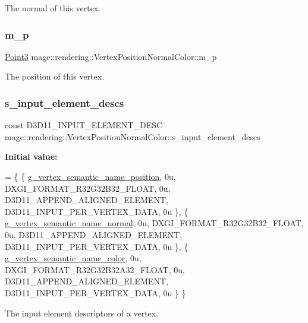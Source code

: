 The normal of this vertex. \mbox{\label{structmage_1_1rendering_1_1_vertex_position_normal_color_ad89961e1a0b0bd97f580a34709e4e05f}} 
\subsubsection{\texorpdfstring{m\+\_\+p}{m\_p}}
{\footnotesize\ttfamily \mbox{\hyperlink{structmage_1_1_point3}{Point3}} mage\+::rendering\+::\+Vertex\+Position\+Normal\+Color\+::m\+\_\+p}

The position of this vertex. \mbox{\label{structmage_1_1rendering_1_1_vertex_position_normal_color_a2b8768994f2e23a278f88a63b7e0364f}} 
\subsubsection{\texorpdfstring{s\+\_\+input\+\_\+element\+\_\+descs}{s\_input\_element\_descs}}
{\footnotesize\ttfamily const D3\+D11\+\_\+\+I\+N\+P\+U\+T\+\_\+\+E\+L\+E\+M\+E\+N\+T\+\_\+\+D\+E\+SC mage\+::rendering\+::\+Vertex\+Position\+Normal\+Color\+::s\+\_\+input\+\_\+element\+\_\+descs\hspace{0.3cm}{\ttfamily [static]}}

{\bfseries Initial value\+:}
\begin{DoxyCode}
= \{
        \{ \mbox{\hyperlink{namespacemage_1_1rendering_1_1anonymous__namespace_02vertex_8cpp_03_a6e875b92e4de38b14e8dc404df41a5ad}{g\_vertex\_semantic\_name\_position}}, 0u, DXGI\_FORMAT\_R32G32B32\_FLOAT, 
         0u, D3D11\_APPEND\_ALIGNED\_ELEMENT, D3D11\_INPUT\_PER\_VERTEX\_DATA, 0u \},
        \{ \mbox{\hyperlink{namespacemage_1_1rendering_1_1anonymous__namespace_02vertex_8cpp_03_a1b4bf08af207f8c1681ecf617b094ef3}{g\_vertex\_semantic\_name\_normal}},   0u, DXGI\_FORMAT\_R32G32B32\_FLOAT,   
       0u, D3D11\_APPEND\_ALIGNED\_ELEMENT, D3D11\_INPUT\_PER\_VERTEX\_DATA, 0u \},
        \{ \mbox{\hyperlink{namespacemage_1_1rendering_1_1anonymous__namespace_02vertex_8cpp_03_aae8cd813faec1e62d4e6463db8c99ab5}{g\_vertex\_semantic\_name\_color}},    0u, DXGI\_FORMAT\_R32G32B32A32\_FLOAT, 
      0u, D3D11\_APPEND\_ALIGNED\_ELEMENT, D3D11\_INPUT\_PER\_VERTEX\_DATA, 0u \}
    \}
\end{DoxyCode}
The input element descriptors of a vertex. 